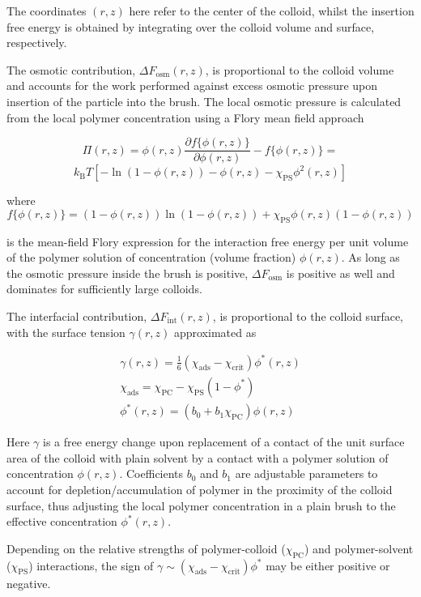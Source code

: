 \documentclass[12pt, a4paper]{article}
\begin{document}
\noindent The coordinates $(r,z)$ here refer to the center of the colloid, whilst the insertion free energy is obtained by integrating over the colloid volume and surface, respectively.

The osmotic contribution, $\Delta F_{\text{osm}}(r,z)$, is proportional to the colloid volume 
and accounts for the work performed against excess osmotic pressure upon insertion of the particle into the brush. 
The local osmotic pressure is calculated from the local polymer concentration using a Flory mean field approach 

$$
\Pi(r,z)=  \phi(r,z)\frac{\partial f\{\phi(r,z)\}}{\partial \phi(r,z)} - f\{\phi(r,z)\}= 
$$
\begin{equation}
	k_{\text{B}}T[-\ln(1-\phi(r,z)) - \phi(r,z) -\chi_{\text{PS}}\phi^2(r,z)]
\end{equation}

\noindent where
$$
f\{\phi(r,z)\}=(1-\phi(r,z))\ln(1-\phi(r,z)) +\chi_{\text{PS}}\phi(r,z)(1-\phi(r,z))
$$

\noindent is the mean-field Flory expression for the interaction free energy per unit volume of the polymer solution of concentration (volume fraction) $\phi(r,z)$.
As long as the osmotic pressure inside the brush is positive, $\Delta F_{\text{osm}}$ is positive as well and dominates for sufficiently large colloids. 

The interfacial contribution, $\Delta F_{\text{int}}(r,z)$, is proportional to the colloid surface, 
with the surface tension $\gamma (r,z)$ approximated as

\begin{eqnarray}
    \gamma (r,z)= \frac{1}{6}(\chi_{\text{ads}} - \chi_{\text{crit}})\phi^{\ast}(r,z)
    \\
    \chi_{\text{ads}} = \chi_{\text{PC}} - \chi_{\text{PS}}(1-\phi^{\ast})
    \\
    \phi^{\ast}(r,z)= (b_{0} + b_{1}\chi_{\text{PC}})\phi(r,z)
\end{eqnarray}

\noindent Here $\gamma$ is a free energy change upon replacement of a contact of the unit surface area of the colloid with plain solvent by a contact with a polymer solution of concentration $\phi(r,z)$.
Coefficients $b_0$ and $b_1$ are adjustable parameters to account for depletion/accumulation of polymer in the proximity of the colloid surface, 
thus adjusting the local polymer concentration in a plain brush to the effective concentration $\phi^{\ast}(r,z)$.

Depending on the relative strengths of polymer-colloid ($\chi_{\text{PC}}$) and polymer-solvent ($\chi_{\text{PS}}$) interactions, 
the sign of $\gamma\sim(\chi_{\text{ads}}-\chi_{\text{crit}})\phi^{\ast}$ may be either positive or negative.
\end{document}
